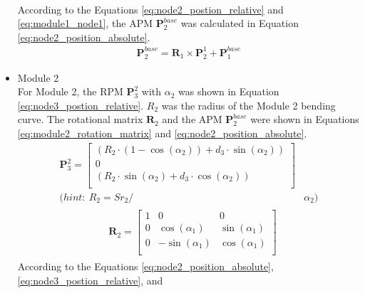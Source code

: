 \begin{itemize}
\begin{align}
        \label{eq:module1_node1} 
    \end{align}
    According to the Equations \ref{eq:node2_postion_relative} and \ref{eq:module1_node1}, the APM 
    $\textbf{P}_{2}^{base}$ was calculated in Equation \ref{eq:node2_position_absolute}.
    \vspace{-5mm}
    \begin{align}
        \textbf{P}_{2}^{base} = \textbf{R}_{1} \times \textbf{P}_{2}^{1} + \textbf{P}_{1}^{base}
        \label{eq:node2_position_absolute}
    \end{align}
    \vspace{-15mm}
    \item Module 2 \\
    For Module 2, the RPM $\textbf{P}_{3}^{2}$ 
    with $\alpha_2$ was shown in Equation \ref{eq:node3_postion_relative}. $R_2$ was the radius of the Module 2 bending 
    curve. The rotational matrix $\textbf{R}_{2}$ and the APM $\textbf{P}_{2}^{base}$ were shown 
    in Equations \ref*{eq:module2_rotation_matrix} and \ref{eq:node2_position_absolute}.
    \begin{align}
        \textbf{P}_{3}^{2} = 
        \begin{bmatrix}
            (R_2\cdot(1-\cos(\alpha_2)) + d_3\cdot \sin(\alpha_2)) \\
            0 \\
            (R_2\cdot \sin(\alpha_2) + d_3\cdot \cos(\alpha_2)) \\
        \end{bmatrix}&
        \label{eq:node3_postion_relative} \\
        \nonumber (hint: \ R_2 = {Sr}_2/ &\alpha_2)
    \end{align}
    \vspace{-15mm}
    \begin{align}
        &\begin{aligned}
            \textbf{R}_{2} = 
            \begin{bmatrix}
                1 & 0 & 0 \\
                0 & \cos(\alpha_1) & \sin(\alpha_1) \\
                0 & -\sin(\alpha_1) & \cos(\alpha_1) \\
            \end{bmatrix}
        \end{aligned}
        \label{eq:module2_rotation_matrix}
    \end{align}
    According to the Equations \ref{eq:node2_position_absolute}, \ref{eq:node3_postion_relative}, and 

\end{itemize}
